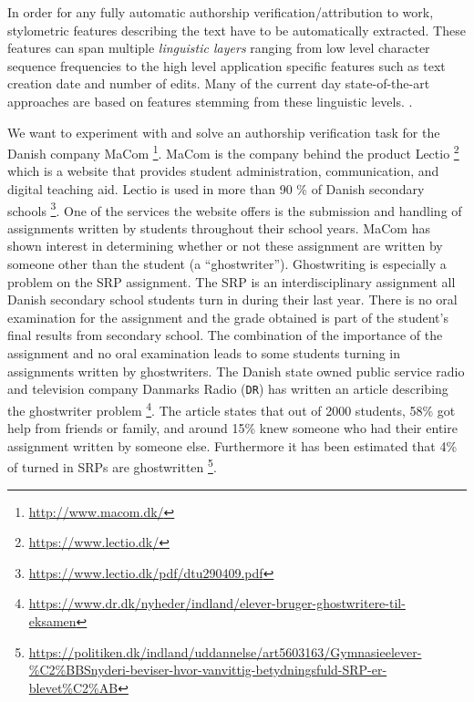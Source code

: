 In order for any fully automatic authorship verification/attribution to work,
stylometric features describing the text have to be automatically extracted.
These features can span multiple \textit{linguistic layers} ranging from low
level character sequence frequencies to the high level application specific
features such as text creation date and number of edits. Many of the current day
state-of-the-art approaches are based on features stemming from these
linguistic levels. \citep{stamatos2009}.


We want to experiment with and solve an authorship verification task for the
Danish company MaCom \footnote{\url{http://www.macom.dk/}}. MaCom is the
company behind the product Lectio \footnote{\url{https://www.lectio.dk/}}
which is a website that provides student administration, communication, and
digital teaching aid. Lectio is used in more than 90 \% of Danish secondary
schools \footnote{\url{https://www.lectio.dk/pdf/dtu290409.pdf}}. One of the
services the website offers is the submission and handling of assignments
written by students throughout their school years. MaCom has shown interest
in determining whether or not these assignment are written by someone
other than the student (a ``ghostwriter''). Ghostwriting is especially a
problem on the \gls{SRP} assignment. The \gls{SRP} is an interdisciplinary
assignment all Danish secondary school students turn in during their
last year. There is no oral examination for the assignment and the grade
obtained is part of the student's final results from secondary school. The
combination of the importance of the assignment and no oral examination
leads to some students turning in assignments written by ghostwriters. The
Danish state owned public service radio and television company Danmarks Radio
(\texttt{DR}) has written an article describing the ghostwriter problem
\footnote{\url{https://www.dr.dk/nyheder/indland/elever-bruger-ghostwritere-til-
eksamen}}. The article states that out of 2000 students, 58\% got
help from friends or family, and around 15\% knew someone who had
their entire assignment written by someone else. Furthermore it has
been estimated that 4\% of turned in \glspl{SRP} are ghostwritten
\footnote{\url{https://politiken.dk/indland/uddannelse/art5603163/Gymnasieelever-\%C2\%BBSnyderi-beviser-hvor-vanvittig-betydningsfuld-SRP-er-blevet\%C2\%AB}}.

